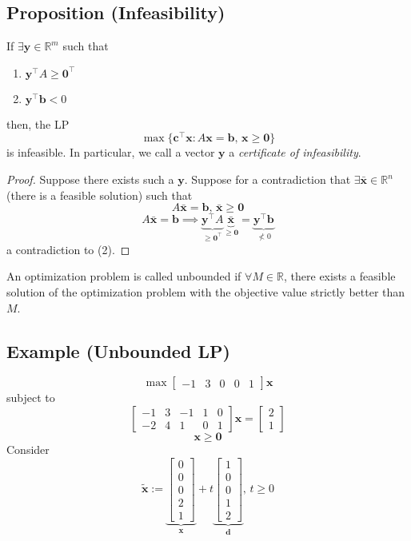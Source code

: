 \begin{thmbox}
    \subsection{Proposition (Infeasibility)}
    If
    $\exists \bm{y}\in\mathbb{R}^m$ such that
    \begin{enumerate}[(1)]
        \item $\bm{y}^\top A\ge\bm{0}^\top $
        \item $\bm{y}^\top \bm{b}<0$
    \end{enumerate}
    then, the LP
    \[\max \{\bm{c}^\top \bm{x} : A\bm{x}=\bm{b},\,
    \bm{x}\ge\bm{0}\}\]
    is infeasible. In particular, we call a vector $\bm{y}$ a \emph{certificate of infeasibility}.
\end{thmbox}

\begin{proof}
Suppose there exists such a $ \bm{y} $.
Suppose for a contradiction that $\exists\bm{\bar{x}}\in\mathbb{R}^n$ 
(there is a feasible solution)
such that
\[A\bm{\bar{x}}=\bm{b} \text{, }\bm{\bar{x}}\ge \bm{0}\]
\[
    A\bm{\bar{x}}=\bm{b}
    \implies
    \underbrace{\bm{y}^\top A}_{\ge\bm{0}^\top }
    \underbrace{\bm{\bar{x}}}_{\ge\bm{0}}
    =\underbrace{\bm{y}^\top \bm{b}}_{\nless 0}
\]
a contradiction to (2).
\end{proof}

An optimization problem is called unbounded if $\forall M\in\mathbb{R}$, there
exists a feasible solution of the optimization problem with the objective 
value strictly better than $M$.
\subsection{Example (Unbounded LP)}
\[\max 
\begin{bmatrix}
    -1 & 3 & 0 & 0 & 1
\end{bmatrix}\bm{x}\]
subject to
\[
    \begin{bmatrix}
        -1 & 3 & -1 & 1 & 0\\
        -2 & 4 & 1 & 0 & 1
    \end{bmatrix}
    \bm{x}
    =
    \begin{bmatrix}
        2\\
        1
    \end{bmatrix}
\]
\[ \bm{x}\ge \bm{0} \]
Consider
\[\bm{\tilde{x}}:=
\underbrace{\begin{bmatrix}
    0\\
    0\\
    0\\
    2\\
    1  
\end{bmatrix}}_{\bm{x}}
+
t
\underbrace{\begin{bmatrix}
    1\\
    0\\
    0\\
    1\\
    2
\end{bmatrix}}_{\bm{d}},\, t\ge 0
\]


